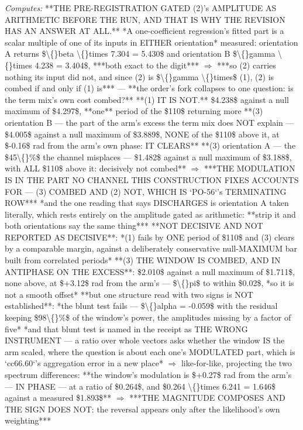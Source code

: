 \begin{description}
\emph{Computes:}  **THE PRE-REGISTRATION GATED (2)'s AMPLITUDE AS ARITHMETIC BEFORE THE RUN, AND THAT IS WHY THE REVISION HAS AN ANSWER AT ALL.** *A one-coefficient regression's fitted part is a scalar multiple of one of its inputs in EITHER orientation*  measured: orientation A returns \$\textbackslash\{\}beta \textbackslash\{\}times 7.304 = 5.430\$ and orientation B \$\textbackslash\{\}gamma \textbackslash\{\}times 4.238 = 3.404\$, ***both exact to the digit***  \ensuremath{\Rightarrow} ***so (2) carries nothing its input did not, and since (2) is \$\textbackslash\{\}gamma \textbackslash\{\}times\$ (1), (2) is combed if and only if (1) is*** --- **the order's fork collapses to one question: is the term mix's own cost combed?**   **(1) IT IS NOT.** \$4.238\$ against a null maximum of \$4.297\$, **one** period of the \$110\$ returning more  **(3) orientation B --- the part of the arm's excess the term mix does NOT explain --- \$4.005\$ against a null maximum of \$3.889\$, NONE of the \$110\$ above it, at \$-0.16\$ rad from the arm's own phase: IT CLEARS**  **(3) orientation A --- the \$45\textbackslash\{\}\%\$ the channel misplaces --- \$1.482\$ against a null maximum of \$3.188\$, with ALL \$110\$ above it: decisively not combed**  \ensuremath{\Rightarrow} ***THE MODULATION IS IN THE PART NO CHANNEL THIS CONSTRUCTION FIXES ACCOUNTS FOR --- (3) COMBED AND (2) NOT, WHICH IS `PO-56`'s TERMINATING ROW***   *and the one reading that says DISCHARGES is orientation A taken literally, which rests entirely on the amplitude gated as arithmetic: **strip it and both orientations say the same thing***   **NOT DECISIVE AND NOT REPORTED AS DECISIVE**: *(1) fails by ONE period of \$110\$ and (3) clears by a comparable margin, against a deliberately conservative null-MAXIMUM bar built from correlated periods*   **(3) THE WINDOW IS COMBED, AND IN ANTIPHASE ON THE EXCESS**: \$2.010\$ against a null maximum of \$1.711\$, none above, at \$+3.12\$ rad from the arm's --- \$\textbackslash\{\}pi\$ to within \$0.02\$, *so it is not a smooth offset*   **but one structure read with two signs is NOT established**: *the blunt test fails --- \$\textbackslash\{\}alpha = -0.059\$ with the residual keeping \$98\textbackslash\{\}\%\$ of the window's power, the amplitudes missing by a factor of five*   *and that blunt test is named in the receipt as THE WRONG INSTRUMENT --- a ratio over whole vectors asks whether the window IS the arm scaled, where the question is about each one's MODULATED part, which is `cc66.60`'s aggregation error in a new place*  \ensuremath{\Rightarrow} like-for-like, projecting the two spectrum differences: **the window's modulation is \$+0.27\$ rad from the arm's --- IN PHASE --- at a ratio of \$0.264\$, and \$0.264 \textbackslash\{\}times 6.241 = 1.646\$ against a measured \$1.893\$**  \ensuremath{\Rightarrow} ***THE MAGNITUDE COMPOSES AND THE SIGN DOES NOT: the reversal appears only after the likelihood's own weighting***

\end{description}
